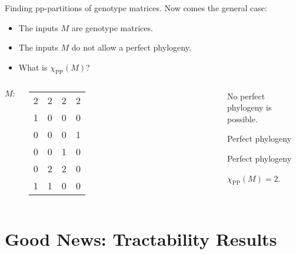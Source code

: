 \documentclass{beamer}
\begin{document}
\begin{frame}{Finding pp-partitions of genotype matrices.}
  Now comes the general case:
  \begin{itemize}
  \item The inputs $M$ are \alert{genotype matrices}.
  \item The inputs $M$ \alert{do not allow a perfect phylogeny}.
  \item What is $\chi_{\operatorname{PP}}(M)$?
  \end{itemize}
  \begin{example}
    \begin{columns}
      $M\colon$
      \footnotesize
      \begin{tabular}{cccc}
        2 & 2 & 2 & 2 \\
        1 & 0 & 0 & 0 \\
        0 & 0 & 0 & 1 \\
        0 & 0 & 1 & 0 \\
        0 & 2 & 2 & 0 \\
        1 & 1 & 0 & 0 
      \end{tabular}%
      {%
      }
      \begin{overprint}
        No perfect phylogeny is possible.
        
        \textcolor{blue!70!bg}{Perfect phylogeny}
        
        \textcolor{red!70!bg}{Perfect phylogeny}
        
        $\chi_{\operatorname{PP}}(M) = 2$.
        
      \end{overprint}
    \end{columns}
  \end{example}
\end{frame}





\section{Good News: Tractability Results}
\end{document}
